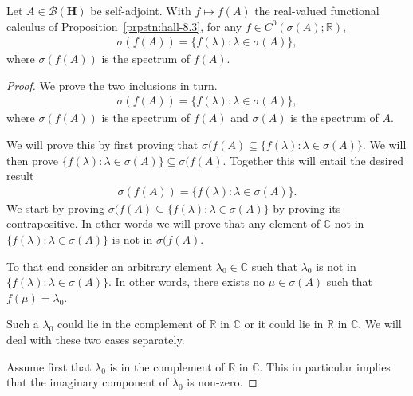 \begin{proposition}
    \label{prpstn:cfc-spectral-mapping}
    \leanok
    Let $A \in \mathcal{B}(\mathbf{H})$ be self-adjoint. With $f \mapsto f(A)$ the real-valued functional calculus of Proposition~\ref{prpstn:hall-8.3}, for any $f \in C^0(\sigma(A); \mathbb{R})$,
    \begin{align}
        \sigma(f(A)) = \{ f(\lambda) : \lambda \in \sigma(A) \},
    \end{align}
    where $\sigma(f(A))$ is the spectrum of $f(A)$.
\end{proposition}
\begin{proof}
    \leanok
We prove the two inclusions in turn.
\begin{align}
    \sigma(f(A)) = \{ f(\lambda) : \lambda \in \sigma(A) \},
\end{align}
where $\sigma(f(A))$ is the spectrum of $f(A)$ and $\sigma(A)$ is the spectrum of $A$.

We will prove this by first proving that $\sigma(f(A) \subseteq \{ f(\lambda) : \lambda \in \sigma(A) \}$. We will then prove $\{ f(\lambda) : \lambda \in \sigma(A) \} \subseteq \sigma(f(A)$. Together this will entail the desired result 
\begin{align}
    \sigma(f(A)) = \{ f(\lambda) : \lambda \in \sigma(A) \}.
\end{align}
We start by proving $\sigma(f(A) \subseteq \{ f(\lambda) : \lambda \in \sigma(A) \}$ by proving its contrapositive. In other words we will prove that any element of $\mathbb{C}$ not in $\{ f(\lambda) : \lambda \in \sigma(A) \}$ is not in $\sigma(f(A)$.

To that end consider an arbitrary element $\lambda_0 \in \mathbb{C}$ such that $\lambda_0$ is not in $\{ f(\lambda) : \lambda \in \sigma(A) \}$. In other words, there exists no $\mu \in \sigma(A)$ such that $f(\mu) = \lambda_0$.

Such a $\lambda_0$ could lie in the complement of $\mathbb{R}$ in $\mathbb{C}$ or it could lie in $\mathbb{R}$ in $\mathbb{C}$. We will deal with these two cases separately.

Assume first that $\lambda_0$ is in the complement of $\mathbb{R}$ in $\mathbb{C}$. This in particular implies that the imaginary component of $\lambda_0$ is non-zero.


\end{proof}
